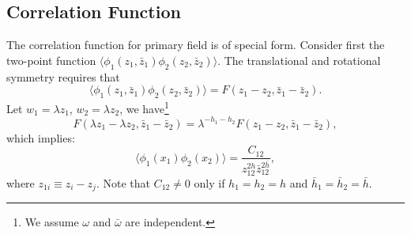 \documentclass[aps,prb,superscriptaddress,nofootinbib]{revtex4}
\begin{document}
\subsection{Correlation Function}
The correlation function for primary field is of special form.
Consider first the two-point function $\langle \phi_1(z_1,\bar z_1) \phi_2(z_2, \bar z_2) \rangle$.
The translational and rotational symmetry requires that
\begin{equation}
	\langle \phi_1(z_1,\bar z_1) \phi_2(z_2, \bar z_2) \rangle = F(z_1-z_2,\bar z_1-\bar z_2).
\end{equation}
Let $w_1 = \lambda z_1$, $w_2 = \lambda z_2$, we have\footnote{We assume $\omega$ and $\bar\omega$ are independent.}
\begin{equation}
	F(\lambda z_1-\lambda z_2, \bar z_1 - \bar z_2)
	= \lambda^{-h_1-h_2} F(z_1-z_2,\bar z_1-\bar z_2),
\end{equation}
which implies:
\begin{equation}
	\langle \phi_1(x_1) \phi_2(x_2) \rangle = \frac{C_{12}}{z_{12}^{2h} \bar z^{2\bar h}_{12}},
\end{equation}
where $z_{1i} \equiv z_i - z_j$.
Note that $C_{12} \ne 0$ only if $h_1=h_2=h$ and $\bar h_1=\bar h_2=\bar h$.
\end{document}
